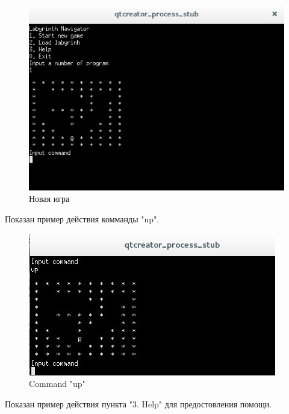 \documentclass[a4paper]{article}
\begin{document}
\begin{figure}[H]
	\begin{center}
		\includegraphics[scale=0.7]{Screenshot/3.jpg}
		\caption{Новая игра} 
		\label{pic:pic_name} %
	\end{center}
\end{figure}

Показан пример действия комманды "up".

\begin{figure}[H]
	\begin{center}
		\includegraphics[scale=0.7]{Screenshot/4.jpg}
		\caption{Command "up"} 
		\label{pic:pic_name} %
	\end{center}
\end{figure}

Показан пример действия пункта "3. Help" для предостовления помощи.
\end{document}
